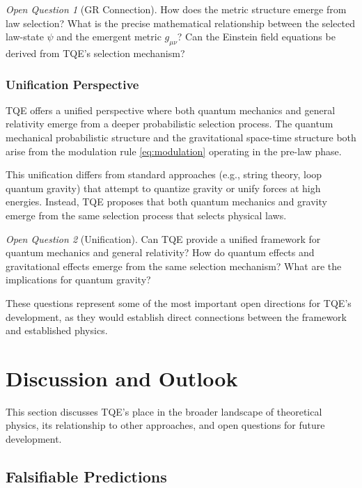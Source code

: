 \documentclass[12pt,a4paper]{article}
\theoremstyle{definition}
\theoremstyle{remark}
\newtheorem{question}{Open Question}[section]
\begin{document}
\begin{question}[GR Connection]
How does the metric structure emerge from law selection? What is the precise mathematical relationship between the selected law-state $\psi$ and the emergent metric $g_{\mu\nu}$? Can the Einstein field equations be derived from TQE's selection mechanism?
\end{question}

\subsubsection{Unification Perspective}

TQE offers a unified perspective where both quantum mechanics and general relativity emerge from a deeper probabilistic selection process. The quantum mechanical probabilistic structure and the gravitational space-time structure both arise from the modulation rule \eqref{eq:modulation} operating in the pre-law phase.

This unification differs from standard approaches (e.g., string theory, loop quantum gravity) that attempt to quantize gravity or unify forces at high energies. Instead, TQE proposes that both quantum mechanics and gravity emerge from the same selection process that selects physical laws.

\begin{question}[Unification]
Can TQE provide a unified framework for quantum mechanics and general relativity? How do quantum effects and gravitational effects emerge from the same selection mechanism? What are the implications for quantum gravity?
\end{question}

These questions represent some of the most important open directions for TQE's development, as they would establish direct connections between the framework and established physics.

\section{Discussion and Outlook}

This section discusses TQE's place in the broader landscape of theoretical physics, its relationship to other approaches, and open questions for future development.

\subsection{Falsifiable Predictions}
\end{document}
